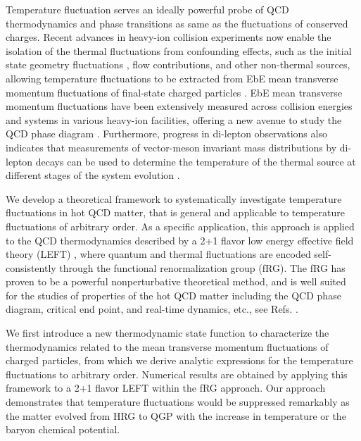 \documentclass[aps,twocolumn,
prl,
superscriptaddress,nofootinbib,floatfix]{revtex4-2}
\begin{document}
Temperature fluctuation serves an ideally powerful probe of QCD thermodynamics and phase transitions as same as the fluctuations of conserved charges. Recent advances in heavy-ion collision experiments now enable the isolation of the thermal fluctuations from confounding effects, such as the initial state geometry fluctuations \cite{Gardim:2011xv, Schenke:2014tga, STAR:2024wgy, ATLAS:2024jvf, Zhang:2025yyd}, flow contributions, and other non-thermal sources, allowing temperature fluctuations to be extracted from EbE mean transverse momentum fluctuations of final-state charged particles \cite{Gavin:2003cb}. EbE mean transverse momentum fluctuations have been extensively measured across collision energies and systems in various heavy-ion facilities, offering a new avenue to study the QCD phase diagram \cite{NA49:1999inh, CERES:2003sap, PHENIX:2003ccl, STAR:2005vxr, NA49:2008fag, ALICE:2023tej, ATLAS:2024jvf}. Furthermore, progress in di-lepton observations also indicates that measurements of vector-meson invariant mass distributions by di-lepton decays can be used to determine the temperature of the thermal source at different stages of the system evolution \cite{NA60:2008dcb, HADES:2019auv, Churchill:2023zkk, STAR:2024bpc}.

We develop a theoretical framework to systematically investigate temperature fluctuations in hot QCD matter, that is general and applicable to temperature fluctuations of arbitrary order. As a specific application, this approach is applied to the QCD thermodynamics described by a 2+1 flavor low energy effective field theory (LEFT) \cite{Wen:2018nkn}, where quantum and thermal fluctuations are encoded self-consistently through the functional renormalization group (fRG). The fRG has proven to be a powerful nonperturbative theoretical method, and is well suited for the studies of properties of the hot QCD matter including the QCD phase diagram, critical end point, and real-time dynamics, etc., see Refs. \cite{Fu:2019hdw, Braun:2020ada, Braun:2023qak, Tan:2024fuq, Fu:2024rto, Dupuis:2020fhh, Fu:2022gou}.

We first introduce a new thermodynamic state function to characterize the thermodynamics related to the mean transverse momentum fluctuations of charged particles, from which we derive analytic expressions for the temperature fluctuations to arbitrary order. Numerical results are obtained by applying this framework to a 2+1 flavor LEFT within the fRG approach. Our approach demonstrates that temperature fluctuations would be suppressed remarkably as the matter evolved from HRG to QGP with the increase in temperature or the baryon chemical potential. 
\end{document}
